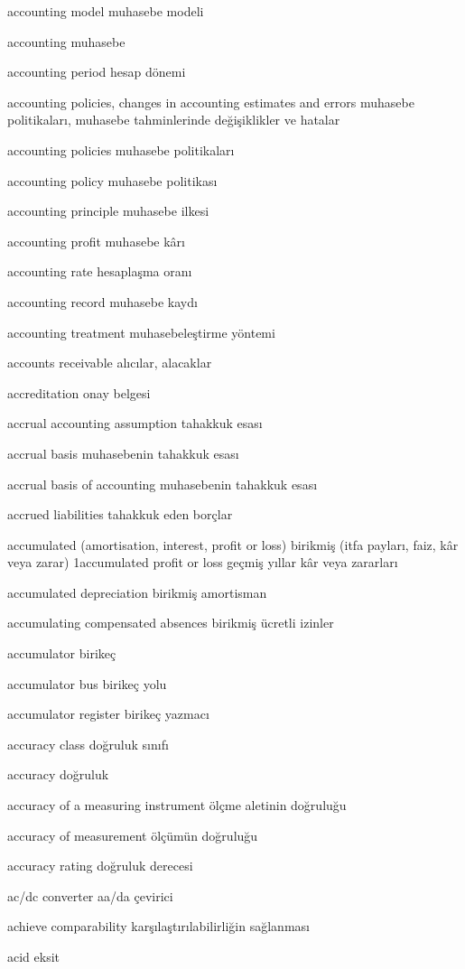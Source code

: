 \documentclass[12pt,fleqn]{article}\usepackage{../../common}
\begin{document}
accounting model muhasebe modeli

accounting muhasebe

accounting period hesap dönemi

accounting policies, changes in accounting estimates and errors muhasebe politikaları, muhasebe tahminlerinde değişiklikler ve hatalar

accounting policies muhasebe politikaları

accounting policy muhasebe politikası

accounting principle muhasebe ilkesi

accounting profit muhasebe kârı

accounting rate hesaplaşma oranı

accounting record muhasebe kaydı

accounting treatment muhasebeleştirme yöntemi

accounts receivable alıcılar, alacaklar

accreditation onay belgesi

accrual accounting assumption tahakkuk esası

accrual basis muhasebenin tahakkuk esası

accrual basis of accounting muhasebenin tahakkuk esası

accrued liabilities tahakkuk eden borçlar

accumulated (amortisation, interest, profit or loss) birikmiş (itfa payları, faiz, kâr veya zarar) 1accumulated profit or loss geçmiş yıllar kâr veya zararları

accumulated depreciation birikmiş amortisman

accumulating compensated absences birikmiş ücretli izinler

accumulator birikeç

accumulator bus birikeç yolu

accumulator register birikeç yazmacı

accuracy class doğruluk sınıfı

accuracy doğruluk

accuracy of a measuring instrument ölçme aletinin doğruluğu

accuracy of measurement ölçümün doğruluğu

accuracy rating doğruluk derecesi

ac/dc converter aa/da çevirici

achieve comparability karşılaştırılabilirliğin sağlanması

acid eksit
\end{document}
